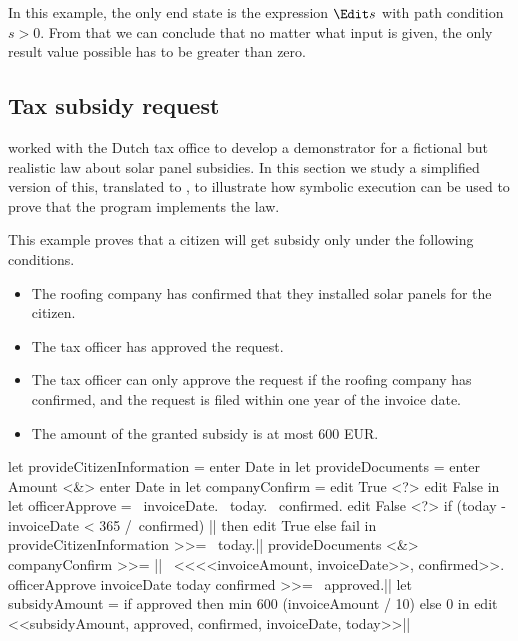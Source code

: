 In this example, the only end state is the expression $\Edit s$ with path condition $s > 0$.
From that we can conclude that no matter what input is given, the only result value possible has to be greater than zero.



\subsection{Tax subsidy request}

\citet{conf/sfp/StutterheimAP17} worked with the Dutch tax office to develop a demonstrator for a fictional but realistic law about solar panel subsidies.
In this section we study a simplified version of this, translated to \TOPHAT, to illustrate how symbolic execution can be used to prove that the program implements the law.

This example proves that a citizen will get subsidy only under the following conditions.
\begin{itemize}
\item The roofing company has confirmed that they installed solar panels for the citizen.
\item The tax officer has approved the request.
\item The tax officer can only approve the request if the roofing company has confirmed, and the request is filed within one year of the invoice date.
\item The amount of the granted subsidy is at most 600 EUR.
\end{itemize}

\begin{TASK}[float=ht
            ,numbers=right
            ,caption=Subsidy request and approval workflow at the Dutch tax office.
            ,label=lst:tax
            ]
  let provideCitizenInformation = enter Date in
  let provideDocuments = enter Amount <&> enter Date in
  let companyConfirm = edit True <?> edit False in
  let officerApprove = \ invoiceDate. \ today. \ confirmed.
    edit False <?> if (today - invoiceDate < 365 /\ confirmed) |\label{lst:tax:officer-approve-def}|
      then edit True
      else fail in
  provideCitizenInformation >>= \ today.|\label{lst:tax:citizen-info}|
  provideDocuments <&> companyConfirm >>= |\label{lst:tax:documents-and-company-confirm}|
    \ <<<<invoiceAmount, invoiceDate>>, confirmed>>.
  officerApprove invoiceDate today confirmed >>= \ approved.|\label{lst:tax:officer-approve}|
  let subsidyAmount = if approved
    then min 600 (invoiceAmount / 10) else 0 in
  edit <<subsidyAmount, approved, confirmed, invoiceDate, today>>|\label{lst:tax:result}|
\end{TASK}

